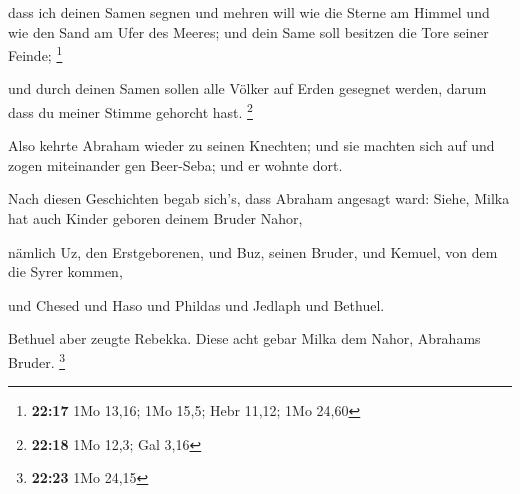  dass ich deinen Samen segnen und mehren will wie die
Sterne am Himmel und wie den Sand am Ufer des Meeres; und dein Same soll
besitzen die Tore seiner Feinde; \footnote{\textbf{22:17} 1Mo 13,16; 1Mo
  15,5; Hebr 11,12; 1Mo 24,60}

 und durch deinen Samen sollen alle Völker auf Erden
gesegnet werden, darum dass du meiner Stimme gehorcht hast. \footnote{\textbf{22:18}
  1Mo 12,3; Gal 3,16}

 Also kehrte Abraham wieder zu seinen Knechten; und sie
machten sich auf und zogen miteinander gen Beer-Seba; und er wohnte
dort.

 Nach diesen Geschichten begab sich's, dass Abraham
angesagt ward: Siehe, Milka hat auch Kinder geboren deinem Bruder Nahor,

 nämlich Uz, den Erstgeborenen, und Buz, seinen Bruder,
und Kemuel, von dem die Syrer kommen,

 und Chesed und Haso und Phildas und Jedlaph und Bethuel.

 Bethuel aber zeugte Rebekka. Diese acht gebar Milka dem
Nahor, Abrahams Bruder. \footnote{\textbf{22:23} 1Mo 24,15}

